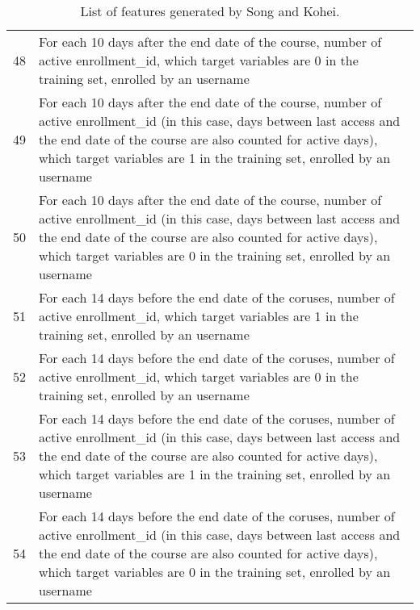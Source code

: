 \begin{center}
\begin{table*}[ht]
\begin{minipage}{\textwidth}
{\begin{tabular}{|l|l|}
      48 & For each 10 days after the end date of the course, number of active enrollment\_id, which target variables are 0 in the training set, enrolled by an username \tabularnewline 
      49 & For each 10 days after the end date of the course, number of active enrollment\_id (in this case, days between last access and the end date of the course are also counted for active days), which target variables are 1 in the training set, enrolled by an username \tabularnewline 
      50 & For each 10 days after the end date of the course, number of active enrollment\_id (in this case, days between last access and the end date of the course are also counted for active days), which target variables are 0 in the training set, enrolled by an username \tabularnewline 
      51 & For each 14 days before the end date of the coruses, number of active enrollment\_id, which target variables are 1 in the training set, enrolled by an username \tabularnewline 
      52 & For each 14 days before the end date of the coruses, number of active enrollment\_id, which target variables are 0 in the training set, enrolled by an username \tabularnewline 
      53 & For each 14 days before the end date of the coruses, number of active enrollment\_id (in this case, days between last access and the end date of the course are also counted for active days), which target variables are 1 in the training set, enrolled by an username \tabularnewline 
      54 & For each 14 days before the end date of the coruses, number of active enrollment\_id (in this case, days between last access and the end date of the course are also counted for active days), which target variables are 0 in the training set, enrolled by an username \tabularnewline 
      \hline
      \end{tabular}
    }
    \hfill{}
    \caption{List of features generated by Song and Kohei.}
    \label{tb:skfeature}
    \end{minipage}
  \end{table*}
\end{center}

